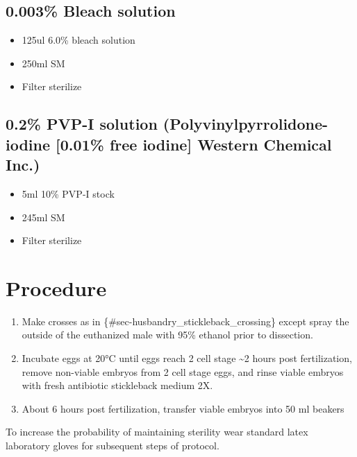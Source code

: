 \documentclass[
  letterpaper,
  DIV=11,
  numbers=noendperiod]{scrreprt}
\providecommand{\tightlist}{%
  \setlength{\itemsep}{0pt}\setlength{\parskip}{0pt}}\usepackage{longtable,booktabs,array}
\begin{document}
\hypertarget{bleach-solution}{%
\subsection{0.003\% Bleach solution}\label{bleach-solution}}

\begin{itemize}
\tightlist
\item
  125ul 6.0\% bleach solution
\item
  250ml SM
\item
  Filter sterilize
\end{itemize}

\hypertarget{pvp-i-solution-polyvinylpyrrolidone-iodine-0.01-free-iodine-western-chemical-inc.}{%
\subsection{0.2\% PVP-I solution (Polyvinylpyrrolidone-iodine {[}0.01\%
free iodine{]} Western Chemical
Inc.)}\label{pvp-i-solution-polyvinylpyrrolidone-iodine-0.01-free-iodine-western-chemical-inc.}}

\begin{itemize}
\tightlist
\item
  5ml 10\% PVP-I stock
\item
  245ml SM
\item
  Filter sterilize
\end{itemize}

\hypertarget{procedure-71}{%
\section{Procedure}\label{procedure-71}}

\begin{enumerate}
\def\labelenumi{\arabic{enumi}.}
\tightlist
\item
  Make crosses as in \{\#sec-husbandry\_stickleback\_crossing\} except
  spray the outside of the euthanized male with 95\% ethanol prior to
  dissection.
\item
  Incubate eggs at 20°C until eggs reach 2 cell stage \textasciitilde2
  hours post fertilization, remove non-viable embryos from 2 cell stage
  eggs, and rinse viable embryos with fresh antibiotic stickleback
  medium 2X.
\item
  About 6 hours post fertilization, transfer viable embryos into 50 ml
  beakers
\end{enumerate}

\begin{tcolorbox}[enhanced jigsaw, rightrule=.15mm, title=\textcolor{quarto-callout-note-color}{\faInfo}\hspace{0.5em}{NOTES}, titlerule=0mm, opacitybacktitle=0.6, toprule=.15mm, bottomrule=.15mm, opacityback=0, left=2mm, colframe=quarto-callout-note-color-frame, breakable, coltitle=black, colback=white, colbacktitle=quarto-callout-note-color!10!white, bottomtitle=1mm, leftrule=.75mm, toptitle=1mm, arc=.35mm]

To increase the probability of maintaining sterility wear standard latex
laboratory gloves for subsequent steps of protocol.

\end{tcolorbox}
\end{document}
